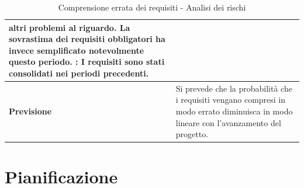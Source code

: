 \documentclass[12pt,a4paper]{article}
\begin{document}
\begin{table}[H]
\begin{center}
\begin{tabular}{p{} p{}}
                    altri problemi al riguardo. La sovrastima dei requisiti obbligatori ha invece semplificato
                    notevolmente questo periodo. \newline
                \textbf{\FPD{}}: I requisiti sono stati consolidati nei periodi precedenti. \\
            \midrule
            \textbf{Previsione} & Si prevede che la probabilità che i requisiti vengano compresi in modo errato
            	diminuisca in modo lineare con l'avanzamento del progetto. \\
			\bottomrule
		\end{tabular}
		\caption{Comprensione errata dei requisiti - Analisi dei rischi}
	\end{center}
\end{table}

\newpage
\section{Pianificazione}
\end{document}
